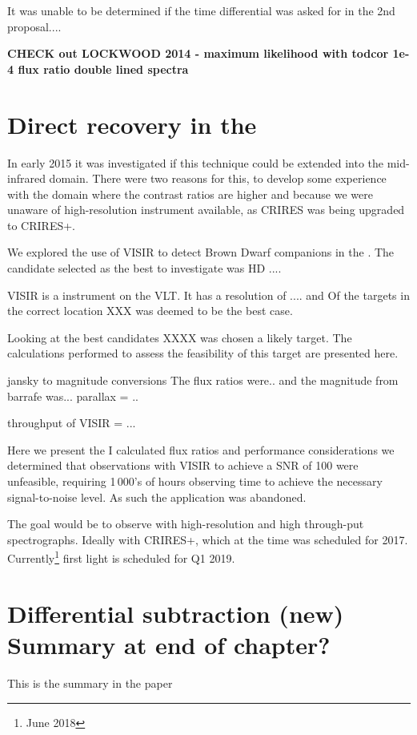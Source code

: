 It was unable to be determined if the time differential was asked for in the 2nd proposal....




\textbf{
CHECK out LOCKWOOD 2014 - maximum likelihood with todcor 1e-4 flux ratio double lined spectra}




\section{Direct recovery in the {\mir{}}}
In early 2015 it was investigated if this technique could be extended into the mid-infrared {\mir{}} domain.
There were two reasons for this, to develop some experience with the {\mir{}} domain where the contrast ratios are higher and because we were unaware of high-resolution \nir{} instrument available, as {CRIRES} was being upgraded to {CRIRES+}.

We explored the use of {VISIR} to detect Brown Dwarf companions in the {\mir{}}. The candidate selected as the best to investigate was HD ....

VISIR is a \mir{} instrument on the VLT. It has a resolution of .... and 
Of the targets in the correct location XXX was deemed to be the best case.


Looking at the best candidates XXXX was chosen a likely target. The calculations performed to assess the feasibility of this target are presented here. 

jansky to magnitude conversions
The flux ratios were.. and the magnitude from barrafe was... parallax = .. 

throughput of VISIR = ... 

Here we present the I calculated flux ratios and performance considerations we determined that observations with {VISIR} to achieve a {SNR} of 100 were unfeasible, requiring 1\,000's of hours observing time to achieve the necessary signal-to-noise level. As such the application was abandoned.

The goal would be to observe with high-resolution and high through-put spectrographs. Ideally with {CRIRES+}, which at the time was scheduled for 2017. Currently\footnote{June 2018} first light is scheduled for Q1 2019.



\section{Differential subtraction (new) Summary at end of chapter?}
\label{sec:spec_diff}
{\red{} This is the summary in the paper}

